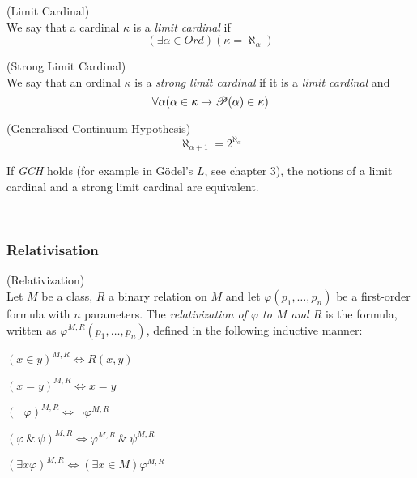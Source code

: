 \begin{definition}{(Limit Cardinal)}\label{def:limit_ordinal}\\
We say that a cardinal $\kappa$ is a \emph{limit cardinal} if
\begin{equation}
(\exists \alpha \in Ord)(\kappa = \aleph_\alpha)
\end{equation}
\end{definition}

\begin{definition}{(Strong Limit Cardinal)}\label{def:limit_ordinal}\\
We say that an ordinal $\kappa$ is a \emph{strong limit cardinal} if it is a \emph{limit cardinal} and 
\begin{equation}
\forall \alpha (\alpha \in \kappa \rightarrow \mathscr{P} (\alpha) \in \kappa)
\end{equation}
\end{definition}

\begin{definition}{(Generalised Continuum Hypothesis)}\\
\begin{equation}
\aleph_{\alpha+1}=2^{\aleph_\alpha}
\end{equation}
\end{definition}
If \emph{GCH} holds (for example in Gödel's $L$, see chapter 3), the notions of a limit cardinal and a strong limit cardinal are equivalent.

\

\subsubsection{Relativisation} %
\begin{definition}{(Relativization)}\label{def:relativization}\\ %
Let $M$ be a class, $R$ a binary relation on $M$ and let $\varphi(p_1, \ldots, p_n)$ be a first-order formula with $n$ parameters. 
The \emph{relativization of $\varphi$ to $M$ and $R$} is the formula, written as $\varphi^{M, R}(p_1, \ldots, p_n)$, defined in the following inductive manner:
\bce[(i)]
\item $(x \in y)^{M,R} \iff R(x, y)$
\item $(x = y)^{M,R} \iff x = y$
\item $(\neg \varphi)^{M,R} \iff \neg \varphi^{M,R}$
\item $(\varphi\ \&\ \psi)^{M,R} \iff \varphi^{M,R}\ \&\ \psi^{M,R}$
\item $(\exists x \varphi)^{M,R} \iff (\exists x \in M) \varphi^{M,R}$
\ece
\end{definition}

